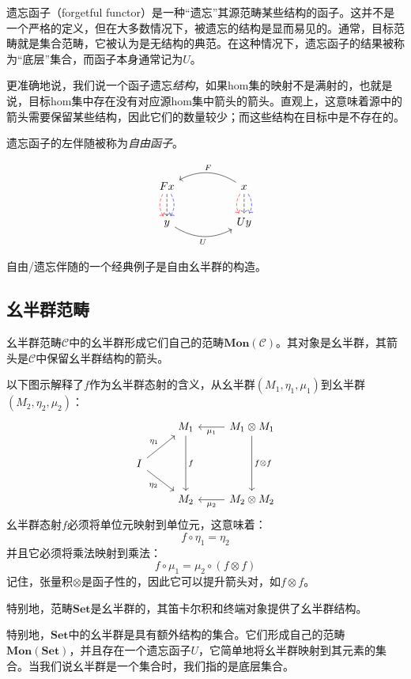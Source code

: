 \documentclass[DaoFP]{subfiles}
\begin{document}
遗忘函子（forgetful functor）是一种“遗忘”其源范畴某些结构的函子。这并不是一个严格的定义，但在大多数情况下，被遗忘的结构是显而易见的。通常，目标范畴就是集合范畴，它被认为是无结构的典范。在这种情况下，遗忘函子的结果被称为“底层”集合，而函子本身通常记为$U$。

更准确地说，我们说一个函子遗忘\emph{结构}，如果hom集的映射不是满射的，也就是说，目标hom集中存在没有对应源hom集中箭头的箭头。直观上，这意味着源中的箭头需要保留某些结构，因此它们的数量较少；而这些结构在目标中是不存在的。

遗忘函子的左伴随被称为\emph{自由函子}。

\[
 \begin{tikzcd}
F x
\arrow[d, bend right, red, dashed]
\arrow[d, dashed]
\arrow[d, bend left, blue, dashed]
  &&
  x
\arrow[d, bend right, red, dashed]
\arrow[d, dashed]
\arrow[d, bend left, blue, dashed]
 \arrow[ll, bend right, "F"']
 \\
y
   \arrow[rr, bend right, "U"']
 &&
 U y
  \end{tikzcd}
\]

自由/遗忘伴随的一个经典例子是自由幺半群的构造。

\subsection{幺半群范畴}
幺半群范畴$\mathcal{C}$中的幺半群形成它们自己的范畴$\mathbf{Mon}(\mathcal{C})$。其对象是幺半群，其箭头是$\mathcal{C}$中保留幺半群结构的箭头。

以下图示解释了$f$作为幺半群态射的含义，从幺半群$(M_1, \eta_1, \mu_1)$到幺半群$(M_2, \eta_2, \mu_2)$：
\[
 \begin{tikzcd}
 & M_1
 \arrow[dd, "f"]
 & M_1 \otimes M_1
 \arrow[l, "\mu_1"]
 \arrow[dd, "f \otimes f"]
 \\
 I
 \arrow[ru, "\eta_1"]
 \arrow[rd, "\eta_2"']
 \\
 & M_2
 & M_2 \otimes M_2
 \arrow[l, "\mu_2"]
  \end{tikzcd}
\]
幺半群态射$f$必须将单位元映射到单位元，这意味着：
\[ f \circ \eta_1 = \eta_2 \]
并且它必须将乘法映射到乘法：
\[ f \circ \mu_1 = \mu_2 \circ (f \otimes f)\]
记住，张量积$\otimes$是函子性的，因此它可以提升箭头对，如$f \otimes f$。

特别地，范畴$\mathbf{Set}$是幺半群的，其笛卡尔积和终端对象提供了幺半群结构。

特别地，$\mathbf{Set}$中的幺半群是具有额外结构的集合。它们形成自己的范畴$\mathbf{Mon}(\mathbf{Set})$，并且存在一个遗忘函子$U$，它简单地将幺半群映射到其元素的集合。当我们说幺半群是一个集合时，我们指的是底层集合。
\end{document}
